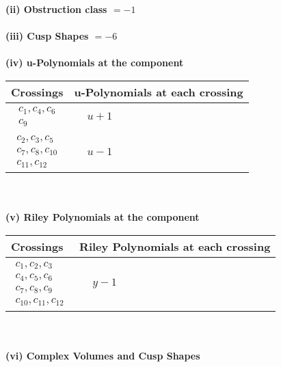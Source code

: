\documentclass[1p]{elsarticle_modified}
\theoremstyle{definition}
\begin{document}
\flushleft \textbf{(ii) Obstruction class $= -1$}\\~\\
\flushleft \textbf{(iii) Cusp Shapes $= -6$}\\~\\
\newpage\renewcommand{\arraystretch}{1}
\flushleft \textbf{(iv) u-Polynomials at the component}\newline \\
\begin{tabular}{m{50pt}|m{274pt}}
Crossings & \hspace{64pt}u-Polynomials at each crossing \\
\hline $$\begin{aligned}c_{1},c_{4},c_{6}\\c_{9}\end{aligned}$$&$\begin{aligned}
&u+1
\end{aligned}$\\
\hline $$\begin{aligned}c_{2},c_{3},c_{5}\\c_{7},c_{8},c_{10}\\c_{11},c_{12}\end{aligned}$$&$\begin{aligned}
&u-1
\end{aligned}$\\
\hline
\end{tabular}\\~\\
\newpage\renewcommand{\arraystretch}{1}
\flushleft \textbf{(v) Riley Polynomials at the component}\newline \\
\begin{tabular}{m{50pt}|m{274pt}}
Crossings & \hspace{64pt}Riley Polynomials at each crossing \\
\hline $$\begin{aligned}c_{1},c_{2},c_{3}\\c_{4},c_{5},c_{6}\\c_{7},c_{8},c_{9}\\c_{10},c_{11},c_{12}\end{aligned}$$&$\begin{aligned}
&y-1
\end{aligned}$\\
\hline
\end{tabular}\\~\\
\newpage\flushleft \textbf{(vi) Complex Volumes and Cusp Shapes}
\end{document}
